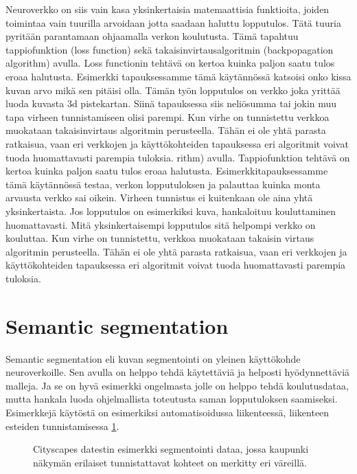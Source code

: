 Neuroverkko on siis vain kasa yksinkertaisia matemaattisia funktioita, joiden toimintaa vain tuurilla arvoidaan jotta saadaan haluttu lopputulos. Tätä tuuria pyritään parantamaan ohjaamalla verkon koulutusta. Tämä tapahtuu tappiofunktion (loss function) sekä takaisinvirtausalgoritmin (backpopagation algorithm) avulla. Loss functionin tehtävä on kertoa kuinka paljon saatu tulos eroaa halutusta. Esimerkki tapauksessamme tämä käytännössä katsoisi onko kissa kuvan arvo mikä sen pitäisi olla. Tämän työn lopputulos on verkko joka yrittää luoda kuvasta 3d pistekartan. Siinä tapauksessa siis neliösumma tai jokin muu tapa virheen tunnistamiseen olisi parempi. Kun virhe on tunnistettu verkkoa muokataan takaisinvirtaus algoritmin perusteella. Tähän ei ole yhtä parasta ratkaisua, vaan eri verkkojen ja käyttökohteiden tapauksessa eri algoritmit voivat tuoda huomattavasti parempia tuloksia.
rithm) avulla.
Tappiofunktion tehtävä on kertoa kuinka paljon saatu tulos eroaa halutusta.
Esimerkkitapauksessamme tämä käytännössä testaa, verkon lopputuloksen ja palauttaa kuinka monta arvausta verkko sai oikein.
Virheen tunnistus ei kuitenkaan ole aina yhtä yksinkertaista. 
Jos lopputulos on esimerkiksi kuva, hankaloituu kouluttaminen huomattavasti.
Mitä yksinkertaisempi lopputulos sitä helpompi verkko on kouluttaa.
Kun virhe on tunnistettu, verkkoa muokataan takaisin virtaus algoritmin perusteella.
Tähän ei ole yhtä parasta ratkaisua, vaan eri verkkojen ja käyttökohteiden tapauksessa eri algoritmit voivat tuoda huomattavasti parempia tuloksia.

\section{Semantic segmentation}

Semantic segmentation eli kuvan segmentointi on yleinen käyttökohde neuroverkoille.
Sen avulla on helppo tehdä käytettäviä ja helposti hyödynnettäviä malleja.
Ja se on hyvä esimerkki ongelmasta jolle on helppo tehdä koulutusdataa, mutta hankala luoda ohjelmallista toteutusta saman lopputuloksen saamiseksi.
Esimerkkejä käytöstä on esimerkiksi automatisoidussa liikenteessä,
liikenteen esteiden tunnistamisessa \ref{fig:labels}.
\begin{figure}[h]
\centering
{}
\caption[Tämä on lyhyt kuvateksti.]{Cityscapes datestin esimerkki segmentointi dataa, jossa kaupunki näkymän erilaiset tunnistattavat kohteet on merkitty eri väreillä.}
\label{fig:labels}
\end{figure}


